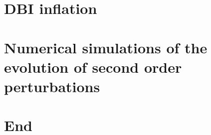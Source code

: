 \documentclass[
12pt,
bibtotoc, %
liststotoc, %
idxtotoc, %
onehalfspacing %
]
{icldt}
\begin{document}







\tableofcontents

\onehalfspacing

% 



\part{DBI inflation}
\label{part:dbi}
% 

% 

% 


\part{Numerical simulations of the evolution of second order perturbations}
\label{part:numerical}




\part{End}


\begin{singlespace}



\end{singlespace}
\end{document}
